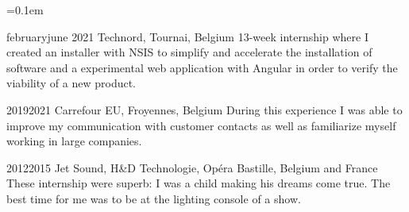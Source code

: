 \begin{indentsection}{\parindent}
  \parskip=0.1em
  \item[]
  {february}{june 2021}
  {Technord, Tournai, Belgium}
  {13-week internship where I created an installer with NSIS to simplify and accelerate the installation of software and a experimental web application with Angular in order to verify the viability of a new product.}

  \item[]
  {2019}{2021}
  {Carrefour EU, Froyennes, Belgium}
  {During this experience I was able to improve my communication with customer contacts as well as familiarize myself working in large companies.}

  \item[]
  {2012}{2015}
  {Jet Sound, H\&D Technologie, Opéra Bastille, Belgium and France}
  {These internship were superb: I was a child making his dreams come true. The best time for me was to be at the lighting console of a show.}
\end{indentsection}
